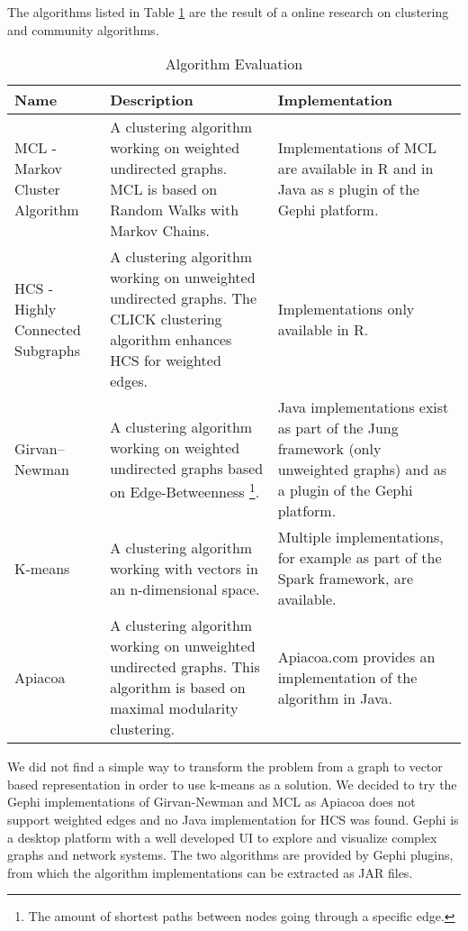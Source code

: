 The algorithms listed in Table \ref{tab:algorithmEvaluation} are the result of a online research on clustering and community algorithms.

\begin{table}[H]
	\centering
	\caption{Algorithm Evaluation}
	\label{tab:algorithmEvaluation}
	\begin{tabular}{|p{90pt}|p{200pt}|p{130pt}|}
		\hline	
		Name & Description & Implementation \\
		\hline
		MCL - Markov Cluster Algorithm\cite{mcl} & A clustering algorithm working on weighted undirected graphs. MCL is based on Random Walks with Markov Chains. & Implementations of MCL are available in R and in Java as s plugin of the Gephi\cite{gephi} platform.  \\
		\hline
		HCS - Highly Connected Subgraphs\cite{hcs} & A clustering algorithm working on unweighted undirected graphs. The CLICK clustering algorithm enhances HCS for weighted edges. & Implementations only available in R.  \\
		\hline
		Girvan–Newman\cite{girvanNewman} & A clustering algorithm working on weighted undirected graphs based on Edge-Betweenness \footnote{The amount of shortest paths between nodes going through a specific edge.}. & Java implementations exist as part of the Jung\cite{jung} framework (only unweighted graphs) and as a plugin of the Gephi\cite{gephi} platform. \\
		\hline	
		K-means\cite{kmeans} & A clustering algorithm working with vectors in an n-dimensional space. & Multiple implementations, for example as part of the Spark\cite{spark} framework, are available. \\
		\hline
		Apiacoa\cite{apiacoa} & A clustering algorithm working on unweighted undirected graphs. This algorithm is based on maximal modularity clustering. & Apiacoa.com provides an implementation of the algorithm in Java. \\
		\hline
	\end{tabular}
\end{table}

We did not find a simple way to transform the problem from a graph to vector based representation in order to use k-means as a solution. We  decided to try the Gephi implementations of Girvan-Newman and MCL as Apiacoa does not support weighted edges and no Java implementation for HCS was found. Gephi is a desktop platform with a well developed \gls{UI} to explore and visualize complex graphs and network systems. The two algorithms are provided by Gephi plugins, from which the algorithm implementations can be extracted as \gls{JAR} files. 
